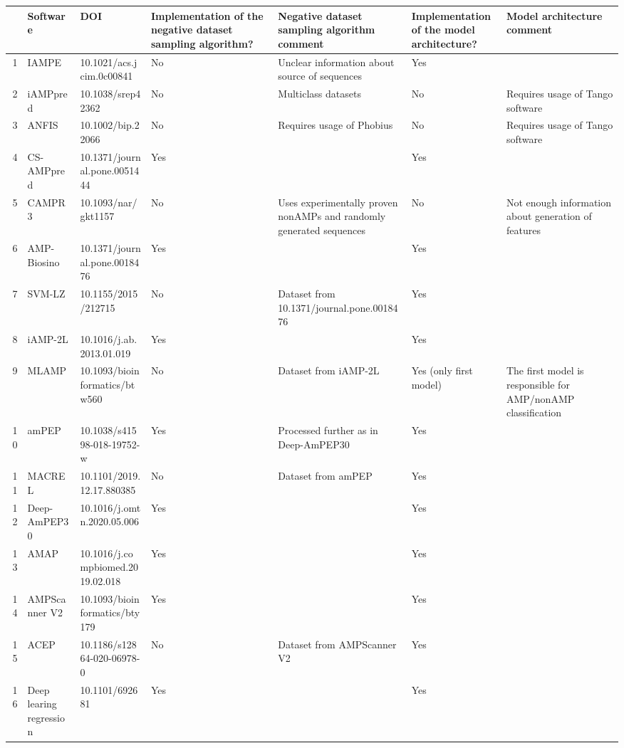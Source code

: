 \begin{table}[ht]
\centering
\begin{tabular}{rllllll}
  \hline
 & Software & DOI & Implementation of the negative dataset sampling algorithm? & Negative dataset sampling algorithm comment & Implementation of the model architecture? & Model architecture comment \\ 
  \hline
1 & IAMPE & 10.1021/acs.jcim.0c00841 & No & Unclear information about source of sequences & Yes &  \\ 
  2 & iAMPpred & 10.1038/srep42362 & No & Multiclass datasets & No & Requires usage of Tango software \\ 
  3 & ANFIS & 10.1002/bip.22066 & No & Requires usage of Phobius & No & Requires usage of Tango software \\ 
  4 & CS-AMPpred & 10.1371/journal.pone.0051444 & Yes &  & Yes &  \\ 
  5 & CAMPR3 & 10.1093/nar/gkt1157 & No & Uses experimentally proven nonAMPs and randomly generated sequences & No & Not enough information about generation of features \\ 
  6 & AMP-Biosino & 10.1371/journal.pone.0018476 & Yes &  & Yes &  \\ 
  7 & SVM-LZ & 10.1155/2015/212715 & No & Dataset from 10.1371/journal.pone.0018476 & Yes &  \\ 
  8 & iAMP-2L & 10.1016/j.ab.2013.01.019 & Yes &  & Yes &  \\ 
  9 & MLAMP & 10.1093/bioinformatics/btw560 & No & Dataset from iAMP-2L & Yes (only first model) & The first model is responsible for AMP/nonAMP classification \\ 
  10 & amPEP & 10.1038/s41598-018-19752-w & Yes & Processed further as in Deep-AmPEP30 & Yes &  \\ 
  11 & MACREL & 10.1101/2019.12.17.880385 & No & Dataset from amPEP & Yes &  \\ 
  12 & Deep-AmPEP30 & 10.1016/j.omtn.2020.05.006 & Yes &  & Yes &  \\ 
  13 & AMAP & 10.1016/j.compbiomed.2019.02.018 & Yes &  & Yes &  \\ 
  14 & AMPScanner V2 & 10.1093/bioinformatics/bty179 & Yes &  & Yes &  \\ 
  15 & ACEP & 10.1186/s12864-020-06978-0 & No & Dataset from AMPScanner V2 & Yes &  \\ 
  16 & Deep learing regression & 10.1101/692681 & Yes &  & Yes &  \\ 

\end{tabular}
\end{table}
